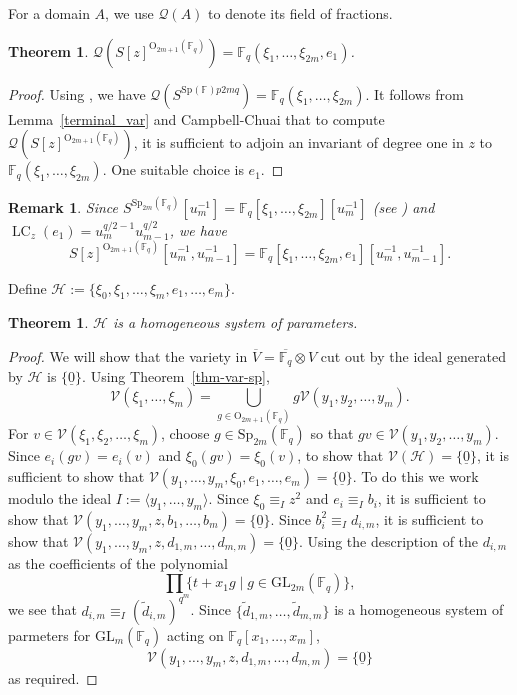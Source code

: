 \documentclass{amsart}
\newtheorem{theorem}[subsection]{Theorem}
\newtheorem{remark}[subsection]{Remark}
\newcommand{\field}{\mathbb{F}}
\newcommand{\gl}[2]{{{\text{GL}_{{#1}}(\field_{#2})}}}
\newcommand{\syp}[2]{{{\text{Sp}_{{#1}}(\field_{#2})}}}
\newcommand{\orth}[2]{{{\text{O}_{{#1}}(\field_{#2})}}}
\newcommand{\V}{\mathcal{V}}
\newcommand{\FF}{\mathcal{Q}}
\DeclareMathOperator{\lc}{LC}
\newcommand{\h}{\mathcal{H}}
\renewcommand{\H}{\mathcal{H}}
\begin{document}
For a domain $A$, we use $\FF(A)$ to denote its field of fractions.

\begin{theorem} \label{thm_FF-char2} $\FF\left(S[z]^{\orth{2m+1}{q}}\right)=\field_q( \xi_1,\ldots,\xi_{2m} ,e_1)$.
\end{theorem}
\begin{proof} Using \cite[Thm 8.3.4]{benson-polyinvafinigrou:93}, we have $\FF\left(S^{\syp{}{}p{2m}{q}}\right)=\field_q(\xi_1,\ldots,\xi_{2m})$.
It follows from Lemma~\ref{terminal_var} and Campbell-Chuai \cite{campbell+chuai-local:07} that to compute $\FF\left(S[z]^{\orth{2m+1}{q}}\right)$,
it is sufficient to adjoin an invariant of degree one in $z$ to $\field_q(\xi_1,\ldots,\xi_{2m})$. One suitable choice is $e_1$.
\end{proof}

\begin{remark} Since $S^{\syp{2m}{q}}[u_m^{-1}]=\field_q[\xi_1,\ldots,\xi_{2m}][u_m^{-1}]$ (see \cite[Thm 8.3.4]{benson-polyinvafinigrou:93})
and $\lc_z(e_1)=u_m^{q/2-1}u_{m-1}^{q/2}$, we have 
$$S[z]^{\orth{2m+1}{q}}[u_m^{-1},u_{m-1}^{-1}]=\field_q[\xi_1,\ldots, \xi_{2m},e_1][u_m^{-1},u_{m-1}^{-1}].$$
\end{remark}

Define $\h:=\{\xi_0,\xi_1,\ldots,\xi_m,e_1,\ldots, e_m\}$.

\begin{theorem} \label{ortho_hsop_thm_char2} $\h$ is a homogeneous system of parameters.
\end{theorem}
\begin{proof} We will show that the variety  in $\overline{V}=\overline{\field_q}\otimes V$
cut out by the ideal generated by $\H$ is $\{\underline{0}\}$. 
Using Theorem~\ref{thm-var-sp},
$$\V( \xi_1,\ldots,\xi_{m})=\bigcup_{g\in \orth{2m+1}{q}}g\V(y_1,y_2,\ldots, y_m).$$
For $v\in \V(\xi_1,\xi_2,\ldots,\xi_m)$, choose $g\in \syp{2m}{q}$ so that $gv\in \V(y_1,y_2,\ldots,y_m)$. 
Since $e_i(gv)=e_i(v)$ and $\xi_0(gv)=\xi_0(v)$, to show that $\V(\H)=\{\underline{0}\}$, it is sufficient to show that
$\V(y_1,\ldots,y_m,\xi_0,e_1,\ldots,e_m)=\{\underline{0}\}$. To do this we work modulo the ideal $I:=\langle y_1,\ldots,y_m\rangle$.
Since $\xi_0\equiv_I z^2$ and $e_i \equiv_I b_i$, it is sufficient to show that $\V(y_1,\ldots,y_m,z,b_1,\ldots,b_m)=\{\underline{0}\}$.
Since $b_i^2\equiv_I d_{i,m}$, it is sufficient to show that $\V(y_1,\ldots,y_m,z,d_{1,m},\ldots,d_{m,m})=\{\underline{0}\}$.
Using the description of the $d_{i,m}$ as the coefficients of the polynomial $$\prod\{t+x_1g\mid g\in \gl{2m}{q}\},$$ we see that
$d_{i,m}\equiv_I(\widetilde{d}_{i,m})^{q^m}$. Since $\{\widetilde{d}_{1,m},\ldots,\widetilde{d}_{m,m}\}$ is a homogeneous system of parmeters for
$\gl{m}{q}$ acting on $\field_q[x_1,\ldots,x_m]$, $$\V(y_1,\ldots,y_m,z,d_{1,m},\ldots,d_{m,m})=\{\underline{0}\}$$ as required.
\end{proof}
\end{document}
